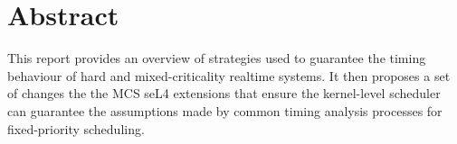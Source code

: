 \chapter*{Abstract}\label{abstract}

This report provides an overview of strategies used to guarantee the
timing behaviour of hard and mixed-criticality realtime systems. It then
proposes a set of changes the the MCS seL4 extensions that ensure the
kernel-level scheduler can guarantee the assumptions made by common
timing analysis processes for fixed-priority scheduling.
